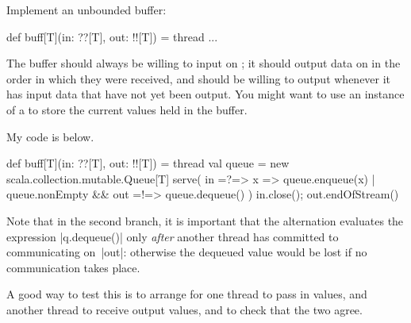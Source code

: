 \begin{question}
Implement an unbounded buffer:
%
\begin{scala}
def buff[T](in: ??[T], out: !![T]) = thread{ ... }
\end{scala}
%
The buffer should always be willing to input on ; it should output
data on  in the order in which they were received, and should be
willing to output whenever it has input data that have not yet been output. 
%
You might want to use an instance of a 
to store the current values held in the buffer.
\end{question}


\begin{answerI}
My code is below. 
\begin{scala}
  def buff[T](in: ??[T], out: !![T]) = thread{
    val queue = new scala.collection.mutable.Queue[T]
    serve(
      in =?=> { x => queue.enqueue(x) }
      | queue.nonEmpty && out =!=> { queue.dequeue() }
    )
    in.close(); out.endOfStream()
  }
\end{scala}
%
Note that in the second branch, it is important that the alternation evaluates
the expression |q.dequeue()| only \emph{after} another thread has committed to
communicating on~|out|: otherwise the dequeued value would be lost if no
communication takes place. 

A good way to test this is to arrange for one thread to pass in values, and
another thread to receive output values, and to check that the two agree.
\end{answerI}
